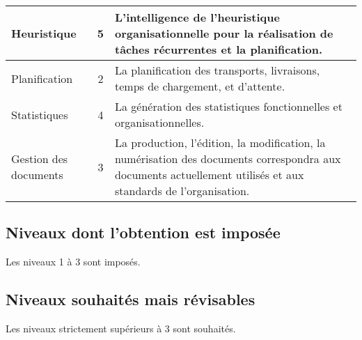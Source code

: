 \begin{tabularx}{\linewidth}{>{\centering}m{2.0cm} c X}
\\\hline
Heuristique & 5 & \og{}L'intelligence\fg{} de l'heuristique organisationnelle pour la réalisation de tâches récurrentes et la planification.
\\\hline
Planification & 2 & La planification des transports, livraisons, temps de chargement, et d'attente.
\\\hline
Statistiques & 4 & La génération des statistiques fonctionnelles et organisationnelles.
\\\hline
Gestion des documents & 3 & La production, l'édition, la modification, la numérisation des documents correspondra aux documents actuellement utilisés et aux standards de l'organisation.
\\\bottomrule
\end{tabularx}

\subsection{Niveaux dont l'obtention est imposée}
Les niveaux 1 à 3 sont imposés.

\subsection{Niveaux souhaités mais révisables}
Les niveaux strictement supérieurs à 3 sont souhaités.
